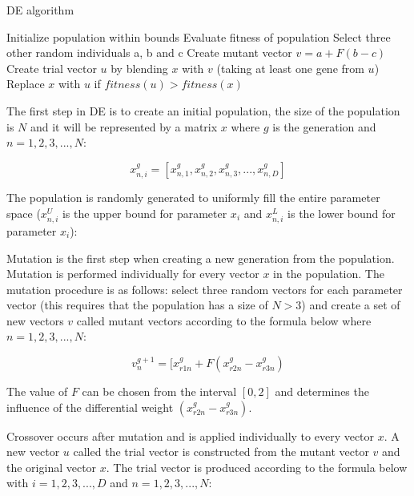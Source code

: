 \begin{algorithm}[h]
  \caption{DE algorithm}
  \label{algo:de}
    \begin{algorithmic}
      \State Initialize population within bounds
      \State Evaluate fitness of population
      \Repeat
          \State Select three other random individuals a, b and c
          \State Create mutant vector $v=a+F(b-c)$
          \State Create trial vector $u$ by blending $x$ with $v$ (taking at least one gene from $u$)
          \State Replace $x$ with $u$ if $fitness(u) > fitness(x)$
        \EndFor
    \end{algorithmic}
\end{algorithm}

The first step in DE is to create an initial population, the size of the population is $N$ and it will be represented by a matrix $x$ where $g$ is the generation and $n=1,2,3,...,N$:

\begin{equation}
x_{n,i}^{g} = [ x_{n,1}^{g}, x_{n,2}^{g}, x_{n,3}^{g}, ..., x_{n,D}^{g} ]
\end{equation}

The population is randomly generated to uniformly fill the entire parameter space ($x_{n,i}^U$ is the upper bound for parameter $x_i$ and $x_{n,i}^L$ is the lower bound for parameter $x_i$):

Mutation is the first step when creating a new generation from the population. Mutation is performed individually for every vector $x$ in the population. The mutation procedure is as follows: select three random vectors for each parameter vector (this requires that the population has a size of $N > 3$) and create a set of new vectors $v$ called mutant vectors according to the formula below where $n=1,2,3,...,N$:

\begin{equation}
v_{n}^{g+1} = [ x_{r1n}^{g} + F(x_{r2n}^{g} - x_{r3n}^{g})
\end{equation}

The value of $F$ can be chosen from the interval $[0,2]$ and determines the influence of the differential weight $(x_{r2n}^{g} - x_{r3n}^{g})$.

Crossover occurs after mutation and is applied individually to every vector $x$. A new vector $u$ called the trial vector is constructed from the mutant vector $v$ and the original vector $x$. The trial vector is produced according to the formula below with $i=1,2,3,...,D$ and $n=1,2,3,...,N$:

